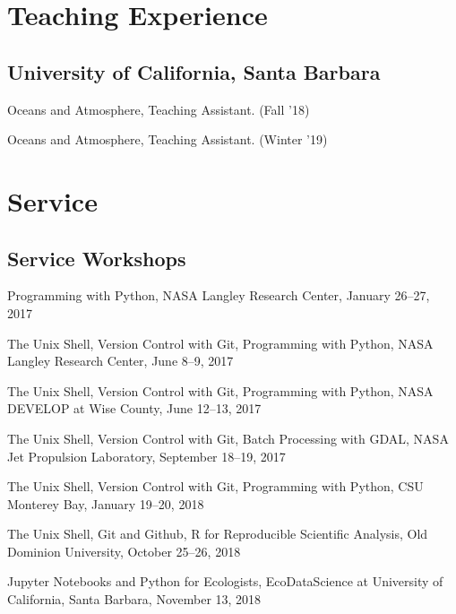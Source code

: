 \documentclass[12pt,letterpaper]{report}
\newcommand{\listitemspace}{0.15em}
\renewenvironment{itemize}
{\begin{list}{}{\setlength{\leftmargin}{0em}
			\setlength{\parskip}{0em}
			\setlength{\itemsep}{\listitemspace}
			\setlength{\parsep}{\listitemspace}}}
	{\end{list}}
\begin{document}
	
	
	\section*{Teaching Experience}
	
	\subsection*{University of California, Santa Barbara}
	
	\begin{itemize}
		
		\item Oceans and Atmosphere, Teaching Assistant. (Fall '18)
		
		\item Oceans and Atmosphere, Teaching Assistant. (Winter '19)
		
	\end{itemize}
	
	
	
	\section*{Service}
	
	\subsection*{Service Workshops}
	
	\begin{itemize}
		
		\item Programming with Python, NASA Langley Research Center, January 26--27, 2017 
		
		\item The Unix Shell, Version Control with Git, Programming with Python, NASA Langley Research Center, June 8--9, 2017
		
                \item The Unix Shell, Version Control with Git, Programming with Python, NASA DEVELOP at Wise County, June 12--13, 2017

                \item The Unix Shell, Version Control with Git, Batch Processing with GDAL, NASA Jet Propulsion Laboratory, September 18--19, 2017

                \item The Unix Shell, Version Control with Git, Programming with Python, CSU Monterey Bay, January 19--20, 2018

                \item The Unix Shell, Git and Github, R for Reproducible Scientific Analysis, Old Dominion University, October 25--26, 2018

                \item Jupyter Notebooks and Python for Ecologists, EcoDataScience at University of California, Santa Barbara, November 13, 2018
		
	\end{itemize}
	
\end{document}
